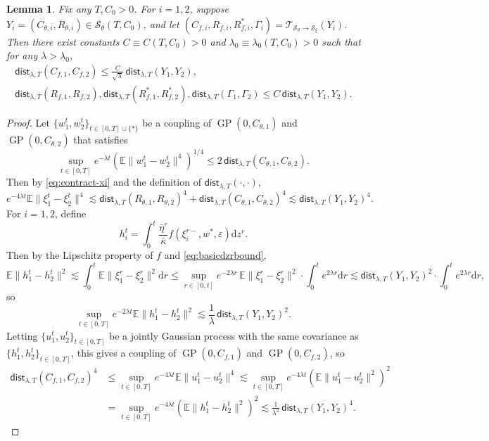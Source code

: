 \documentclass[11pt,letterpaper,reqno]{amsart}
\newtheorem{lem}[thm]{Lemma}
\theoremstyle{definition}
\def\eps{\varepsilon}
\def\d{\mathrm{d}}
\def\E{\mathbb{E}}
\def\GP{\operatorname{GP}}
\def\trsfrmB{\mathcal{T}_{{\mathcal{S}}_\theta \to \mathcal{S}_\xi}}
\newcommand{\lbddst}[2]{\mathsf{dist}_{\lambda,T}(#1,#2)}
\newcommand{\norm}[1]{\|#1\|}
\begin{document}
\begin{lem}\label{lem:contract-fsys}
Fix any $T,C_0>0$. For $i=1,2$, suppose
$Y_i=(C_{\theta,i},R_{\theta,i}) \in {\mathcal{S}}_\theta(T,C_0)$, and
let $(C_{f,i},R_{f,i},R_{f,i}^*,\Gamma_i)=\trsfrmB(Y_i)$. Then there exist
constants $C \equiv C(T,C_0)>0$ and $\lambda_0 \equiv \lambda_0(T,C_0)>0$
such that for any $\lambda>\lambda_0$,
\[\begin{gathered}
\lbddst{C_{f,1}}{C_{f,2}} \leq \frac{C}{\sqrt{\lambda}}\,\lbddst{Y_1}{Y_2}, \\
\lbddst{R_{f,1}}{R_{f,2}},\lbddst{R_{f,1}^*}{R_{f,2}^*},
\lbddst{\Gamma_1}{\Gamma_2} \leq C\,\lbddst{Y_1}{Y_2}.
\end{gathered}\]
\end{lem}
\begin{proof}
Let $\{w^t_1,w^t_2\}_{t \in [0,T] \cup \{*\}}$ be a coupling
of $\GP(0,C_{\theta,1})$ and $\GP(0,C_{\theta,2})$ that satisfies
\begin{equation}\label{eq:wcoupling}
\sup_{t \in [0, T]} e^{-\lambda t} (\mathbb{E}\norm{w^t_1 -
w^t_2}^4)^{1/4}  \leq 2\,\lbddst{C_{\theta,1}}{C_{\theta,2}}.
\end{equation}
Then by \eqref{eq:contract-xi} and the definition of $\lbddst{\cdot}{\cdot}$,
\[e^{-4\lambda t}
\E\|\xi_1^t-\xi_2^t\|^4 \lesssim 
\lbddst{R_{\theta,1}}{R_{\theta,2}}^4+\lbddst{C_{\theta,1}}{C_{\theta,2}}^4
\lesssim \lbddst{Y_1}{Y_2}^4.\]
For $i=1,2$, define
\[h_i^t=\int_0^t \frac{\bar\eta^r}{\bar\kappa}f(\xi_i^{r-},w^*,\eps) \d z^r.\]
Then by the Lipschitz property of $f$ and \eqref{eq:basicdzrbound},
\[\E\|h_1^t-h_2^t\|^2
\lesssim \int_0^t \E\|\xi_1^r-\xi_2^r\|^2 \d r
\leq \sup_{r \in [0,t]}
e^{-2\lambda r}\,\E\|\xi_1^r-\xi_2^r\|^2
\cdot \int_0^t e^{2\lambda r} \d r
\lesssim \lbddst{Y_1}{Y_2}^2 \cdot \int_0^t e^{2\lambda r} \d r,\]
so
\[\sup_{t \in [0,T]} e^{-2\lambda t}
\E\|h_1^t-h_2^t\|^2 \lesssim \frac{1}{\lambda}\,\lbddst{Y_1}{Y_2}^2.\]
Letting $\{u_1^t,u_2^t\}_{t \in [0,T]}$ be a jointly Gaussian process with the
same covariance as $\{h_1^t,h_2^t\}_{t \in [0,T]}$, this gives a coupling of
$\GP(0,C_{f,1})$ and $\GP(0,C_{f,2})$, so
\begin{align*}
\lbddst{C_{f,1}}{C_{f,2}}^4
&\leq \sup_{t \in [0, T]} e^{-4\lambda t} 
\E {\norm{u^t_1 - u^t_2}^4}
\lesssim \sup_{t \in [0, T]} e^{-4\lambda t} 
(\E {\norm{u^t_1 - u^t_2}^2})^2\\
&=\sup_{t \in [0, T]} e^{-4\lambda t} 
(\E{\norm{h^t_1 - h^t_2}^2})^2
\lesssim \frac{1}{\lambda^2}\,\lbddst{Y_1}{Y_2}^4.
\end{align*}


\end{proof}
\end{document}
